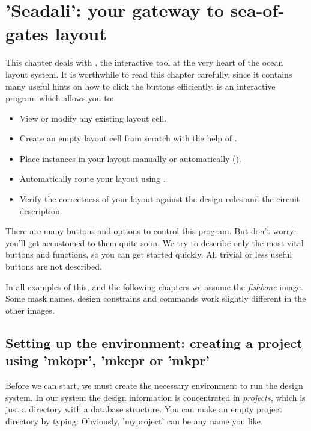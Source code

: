 
\chapter{'Seadali': your gateway to sea-of-gates layout}
\label{s-seadali}
This chapter deals with , the interactive tool at the very heart
of the {\sc ocean} layout system.  It is worthwhile to read this chapter
carefully, since it contains many useful hints on how to click the buttons
efficiently.
 is an interactive program which allows you to:
\begin{itemize}
\item
View or modify any existing layout cell.
\item
Create an empty layout cell from scratch with the help of .
\item
Place instances in your layout manually or automatically ().
\item
Automatically route your layout using .
\item
Verify the correctness of your layout against the design rules and the circuit
description.
\end{itemize}
There are many buttons and options to control this program.  But don't worry:
you'll get accustomed to them quite soon.  We try to describe only the most
vital buttons and functions, so you can get started quickly. All trivial or
less useful buttons are not described.

In all examples of this, and the following chapters we assume the {\sl
fishbone} image. Some mask names, design constrains and commands work slightly
different in the other images. 

\section{Setting up the environment: creating a project using
'mkopr', 'mkepr or 'mkpr'}
\label{mkopr}
Before we can start, we must create the necessary environment to run the design
system. In our system the design information is concentrated in {\em
projects}, 
which is just a  directory with a database structure. You
can make an empty project directory by typing: \cd{}
 
Obviously, 'myproject' can be any name you like. 

